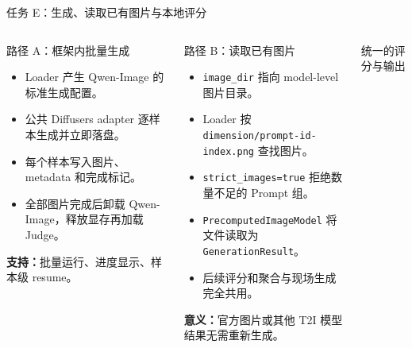 \documentclass[aspectratio=169,10pt]{beamer}
\begin{document}
\begin{frame}{任务 E：生成、读取已有图片与本地评分}
  \begin{columns}[T,onlytextwidth]
      \begin{block}{路径 A：框架内批量生成}
        \begin{minipage}[c][4.95cm][c]{\linewidth}
          \begin{itemize}\scriptsize
            \item Loader 产生 Qwen-Image 的标准生成配置。
            \item 公共 Diffusers adapter 逐样本生成并立即落盘。
            \item 每个样本写入图片、metadata 和完成标记。
            \item 全部图片完成后卸载 Qwen-Image，释放显存再加载 Judge。
          \end{itemize}
          \vspace{0.35em}
          \scriptsize\textbf{支持：}批量运行、进度显示、样本级 resume。
        \end{minipage}
      \end{block}
      \begin{block}{路径 B：读取已有图片}
        \begin{minipage}[c][4.95cm][c]{\linewidth}
          \begin{itemize}\scriptsize
            \item \texttt{image\_dir} 指向 model-level 图片目录。
            \item Loader 按 \texttt{dimension/prompt-id-index.png} 查找图片。
            \item \texttt{strict\_images=true} 拒绝数量不足的 Prompt 组。
            \item \texttt{PrecomputedImageModel} 将文件读取为 \texttt{GenerationResult}。
            \item 后续评分和聚合与现场生成完全共用。
          \end{itemize}
          \vspace{0.35em}
          \scriptsize\textbf{意义：}官方图片或其他 T2I 模型结果无需重新生成。
        \end{minipage}
      \end{block}
      \begin{block}{统一的评分与输出}
        \begin{minipage}[c][4.95cm][c]{\linewidth}

\end{minipage}
\end{block}
\end{columns}
\end{frame}
\end{document}

